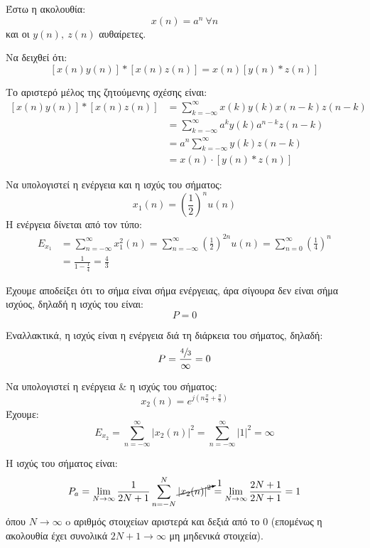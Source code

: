 \documentclass[11pt,a4paper,notitlepage,fleqn,draft]{article}
\begin{document}
\begin{exercise}
	Έστω η ακολουθία:
	\[
	x(n) = a^n\ \forall n
	\]
	και οι \( y(n), \ z(n) \) αυθαίρετες.
	
	Να δειχθεί ότι:
	\[
	\left[
	x(n)y(n)
	\right]*\left[
	x(n)z(n)
	\right] = x(n)\left[
	y(n)*z(n)
	\right]
	\]
	
	\tcblower
	
	Το αριστερό μέλος της ζητούμενης σχέσης είναι:
	\begin{align*}
		\left[
		x(n)y(n)
		\right]*\left[
		x(n)z(n)
		\right] &=
		\sum_{k=-\infty}^{\infty}
		x(k)y(k)x(n-k)z(n-k)
		\\ &= \sum_{k=-\infty}^{\infty} a^k y(k)a^{n-k} z(n-k)
		\\ &= a^n \sum_{k=-\infty}^{\infty} y(k) z(n-k)
		\\ &= x(n) \cdot \left[y(n) * z(n)\right]
	\end{align*}
\end{exercise}

\begin{exercise}
	Να υπολογιστεί η ενέργεια και η ισχύς του σήματος:
	\[
	x_1(n) = \left( \frac{1}{2} \right)^n u(n)
	\]
	\tcblower
	Η ενέργεια δίνεται από τον τύπο:
	\begin{align*}
		E_{x_1} &=
		\sum_{n=-\infty}^{\infty}x_1^2(n) = \sum_{n=-\infty}^{\infty}\left(\frac{1}{2}\right)^{2n}
		u(n) = \sum_{n=0}^{\infty}\left( \frac{1}{4} \right)^n
		\\ &= \frac{1}{1-\frac{1}{4}} = \frac{4}{3}
	\end{align*}
	
	Έχουμε αποδείξει ότι το σήμα είναι σήμα ενέργειας, άρα σίγουρα δεν είναι σήμα ισχύος, δηλαδή η ισχύς του είναι:
	\[
	P=0
	\]
	
	Εναλλακτικά, η ισχύς είναι η ενέργεια διά τη διάρκεια του σήματος, δηλαδή:
	\[
	P = \frac{\sfrac{4}{3} }{\infty} = 0
	\]
\end{exercise}

\begin{exercise}
	Να υπολογιστεί η ενέργεια \& η ισχύς του σήματος:
	\[
	x_2(n) = e^{j\left( n\frac{π}{2} + \frac{π}{8} \right)}
	\]
	\tcblower
	Έχουμε:
	\[
	E_{x_2} = \sum_{n=-\infty}^{\infty} \left|x_2(n)\right|^2 = \sum_{n=-\infty}^{\infty} |1|^2 = \infty
	\]
	
	Η ισχύς του σήματος είναι:
	\[
	P_a = \lim_{N\to \infty}\frac{1}{2N+1}
	\sum_{n=-N}^{N} \cancelto{1}{\left|x_2(n)\right|^2}
	= \lim_{N\to \infty}\frac{2N+1}{2N+1} = 1
	\]
	όπου \( N\to \infty \) o αριθμός στοιχείων αριστερά και δεξιά από το 0 (επομένως η ακολουθία έχει συνολικά \( 2N+1\to \infty \) μη μηδενικά στοιχεία).
\end{exercise}
\end{document}

